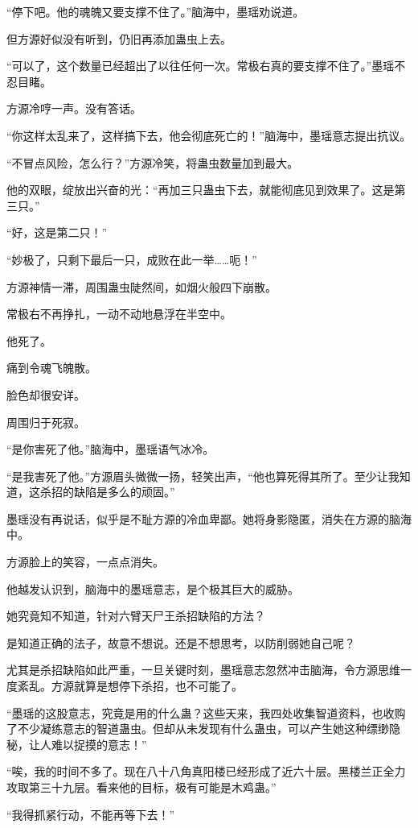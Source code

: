 \begin{this_body}
“停下吧。他的魂魄又要支撑不住了。”脑海中，墨瑶劝说道。

但方源好似没有听到，仍旧再添加蛊虫上去。

“可以了，这个数量已经超出了以往任何一次。常极右真的要支撑不住了。”墨瑶不忍目睹。

方源冷哼一声。没有答话。

“你这样太乱来了，这样搞下去，他会彻底死亡的！”脑海中，墨瑶意志提出抗议。

“不冒点风险，怎么行？”方源冷笑，将蛊虫数量加到最大。

他的双眼，绽放出兴奋的光：“再加三只蛊虫下去，就能彻底见到效果了。这是第三只。”

“好，这是第二只！”

“妙极了，只剩下最后一只，成败在此一举……呃！”

方源神情一滞，周围蛊虫陡然间，如烟火般四下崩散。

常极右不再挣扎，一动不动地悬浮在半空中。

他死了。

痛到令魂飞魄散。

脸色却很安详。

周围归于死寂。

“是你害死了他。”脑海中，墨瑶语气冰冷。

“是我害死了他。”方源眉头微微一扬，轻笑出声，“他也算死得其所了。至少让我知道，这杀招的缺陷是多么的顽固。”

墨瑶没有再说话，似乎是不耻方源的冷血卑鄙。她将身影隐匿，消失在方源的脑海中。

方源脸上的笑容，一点点消失。

他越发认识到，脑海中的墨瑶意志，是个极其巨大的威胁。

她究竟知不知道，针对六臂天尸王杀招缺陷的方法？

是知道正确的法子，故意不想说。还是不想思考，以防削弱她自己呢？

尤其是杀招缺陷如此严重，一旦关键时刻，墨瑶意志忽然冲击脑海，令方源思维一度紊乱。方源就算是想停下杀招，也不可能了。

“墨瑶的这股意志，究竟是用的什么蛊？这些天来，我四处收集智道资料，也收购了不少凝练意志的智道蛊虫。但却从未发现有什么蛊虫，可以产生她这种缥缈隐秘，让人难以捉摸的意志！”

“唉，我的时间不多了。现在八十八角真阳楼已经形成了近六十层。黑楼兰正全力攻取第三十九层。看来他的目标，极有可能是木鸡蛊。”

“我得抓紧行动，不能再等下去！”

\end{this_body}

